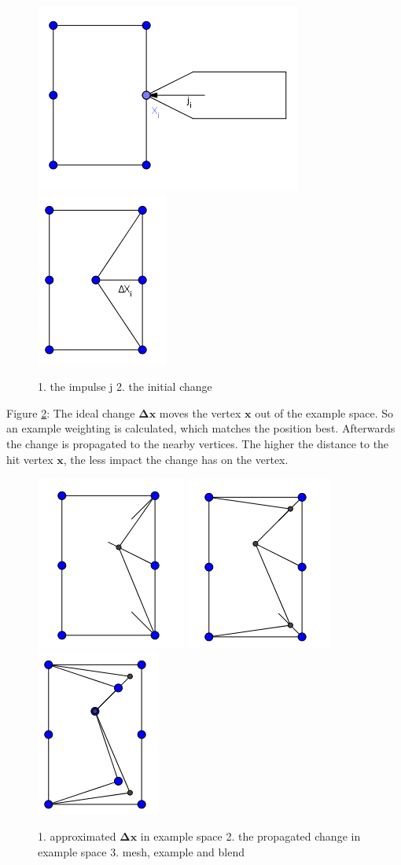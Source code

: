 \documentclass[
	11pt, 
	DIV10,
	a4paper, 
	oneside, 
	headings=normal, 
	captions=tableheading,
	final, 
	numbers=noenddot
]{scrartcl}
\begin{document}
\begin{figure}[tb]
	\centering
	\includegraphics[height=.3\linewidth]{images/ex3} 	
	\includegraphics[height=.31\linewidth]{images/ex4} 	
	\caption{\label{fig:ex2} 1. the impulse j 2. the initial change}
\end{figure}
Figure \ref{fig:ex3}: The ideal change $\bm{\Delta x}$ moves the vertex $\bm{x}$ out of the example space. So an example weighting is calculated, which matches the position best. Afterwards the change is propagated to the nearby vertices. The higher the distance to the hit vertex $\bm{x}$, the less impact the change has on the vertex.
\begin{figure}[tb]
	\centering
	\includegraphics[height=.3\linewidth]{images/ex6} 	
	\includegraphics[height=.31\linewidth]{images/ex7} 	
	\includegraphics[height=.31\linewidth]{images/ex8} 	
	\caption{\label{fig:ex3} 1. approximated $\bm{\Delta x}$ in example space 2. the propagated change in example space 3. mesh, example and blend}
\end{figure}
\end{document}
